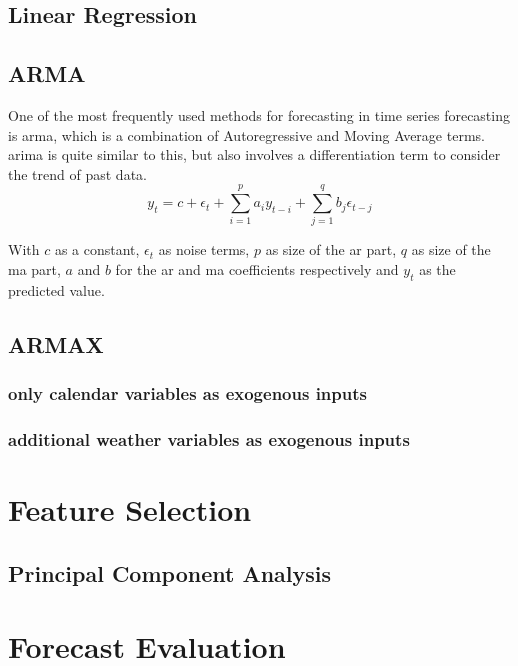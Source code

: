 \subsection{Linear Regression}


\subsection{ARMA}

One of the most frequently used methods for forecasting in time series forecasting is \gls{arma}, which is a combination of Autoregressive and Moving Average terms. \gls{arima} is quite similar to this, but also involves a differentiation term to consider the trend of past data.\\

\begin{equation}
y_t = c+\epsilon_t+\sum_{i=1}^{p}a_iy_{t-i}+\sum_{j=1}^{q}b_j\epsilon_{t-j}
\end{equation}

With $c$ as a constant, $\epsilon_t$ as noise terms, $p$ as size of the \gls{ar} part, $q$ as size of the \gls{ma} part, $a$ and $b$ for the \gls{ar} and \gls{ma} coefficients respectively and $y_t$ as the predicted value.\\

\subsection{ARMAX}

\subsubsection{only calendar variables as exogenous inputs}

\subsubsection{additional weather variables as exogenous inputs}

\section{Feature Selection}
\label{sec:featsel}

\subsection{Principal Component Analysis}

\section{Forecast Evaluation}
\label{sec:fceval}

